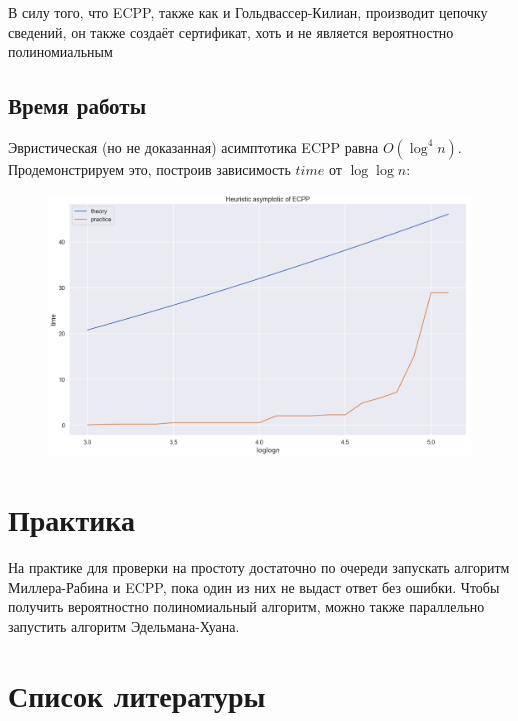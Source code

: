 \documentclass[12pt]{article}
\theoremstyle{definition}
\numberwithin{Def}{section}
\numberwithin{Th}{section}
\numberwithin{St}{section}
\numberwithin{Cor}{section}
\begin{document}
В силу того, что ECPP, также как и Гольдвассер-Килиан, производит цепочку
сведений, он также создаёт сертификат, хоть и не является вероятностно
полиномиальным

\subsection{Время работы}

Эвристическая (но не доказанная) асимптотика ECPP равна $O(\log^4 n)$.
Продемонстрируем это, построив зависимость $time$ от $\log\log n$:

\begin{figure}[H]
 	\includegraphics[width=\linewidth]{ecpp.png}
\end{figure}

\section{Практика}

На практике для проверки на простоту достаточно по очереди запускать
алгоритм Миллера-Рабина и ECPP, пока один из них не выдаст ответ без ошибки.
Чтобы получить вероятностно полиномиальный алгоритм, можно также параллельно
запустить алгоритм Эдельмана-Хуана.

\section{Список литературы}
\end{document}
